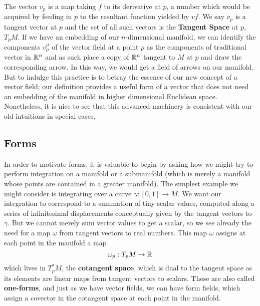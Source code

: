  The vector $v_p$ is a map taking $f$ to its derivative at $p$, a number which would be acquired by feeding in $p$ to the resultant function yielded by $vf$.  We say $v_p$ is a tangent vector at $p$ and the set of all such vectors is the \textbf{Tangent Space} at $p$, $T_pM$.  If we have an embedding of our $n$-dimensional manifold, we can identify the components $v_p^\mu$ of the vector field at a point $p$ as the components of traditional vector in $\mathbb{R}^n$ and as such place a copy of $\mathbb{R}^n$ tangent to $M$ at $p$ and draw the corresponding arrow.  In this way, we would get a field of arrows on our manifold.  But to indulge this practice is to betray the essence of our new concept of a vector field; our definition provides a useful form of a vector that does not need an embedding of the manifold in higher dimensional Euclidean space.  Nonetheless, it is nice to see that this advanced machinery is consistent with our old intuitions in special cases.\\
  

\subsection*{Forms}
In order to motivate forms, it is valuable to begin by asking how we might try to perform integration on a manifold or a submanifold (which is merely a manifold whose points are contained in a greater manifold).  The simplest example we might consider is integrating over a curve $\gamma: [0, 1] \to M$.  We want our integration to correspond to a summation of tiny scalar values, computed along a series of infinitesimal displacements conceptually given by the tangent vectors to $\gamma$.  But we cannot merely sum vector values to get a scalar, so we see already the need for a map $\omega$ from tangent vectors to real numbers.  This map $\omega$ assigns at each point in the manifold a map 
\begin{equation*}
	\omega_p: T_pM \to \mathbb{R}
\end{equation*} 
which lives in $T^*_pM$, the \textbf{cotangent space}, which is dual to the tangent space as its elements are linear maps from tangent vectors to scalars.  These are also called \textbf{one-forms}, and just as we have vector fields, we can have form fields, which assign a covector in the cotangent space at each point in the manifold.\\

